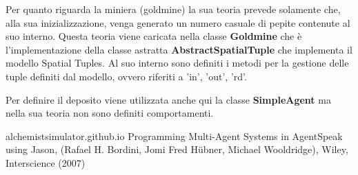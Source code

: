 \documentclass[12pt,a4paper,openright,twoside]{report}
\begin{document}
Per quanto riguarda la miniera (goldmine) la sua teoria prevede solamente che, alla sua inizializzazione, venga generato un numero casuale di pepite contenute al suo interno.
Questa teoria viene caricata nella classe \textbf{Goldmine} che \`e l'implementazione della classe astratta \textbf{AbstractSpatialTuple} che implementa il modello Spatial Tuples.
Al suo interno sono definiti i metodi per la gestione delle tuple definiti dal modello, ovvero riferiti a 'in', 'out', 'rd'.

Per definire il deposito viene utilizzata anche qui la classe \textbf{SimpleAgent} ma nella sua teoria non sono definiti comportamenti.




\begin{thebibliography}{90} %
\rhead[\fancyplain{}{\bfseries \leftmark}]{\fancyplain{}{\bfseries \thepage}}

 alchemistsimulator.github.io
 Programming Multi-Agent Systems in AgentSpeak using Jason, (Rafael H. Bordini, Jomi Fred H\"{u}bner, Michael Wooldridge), Wiley, Interscience (2007)

\end{thebibliography}
\end{document}

